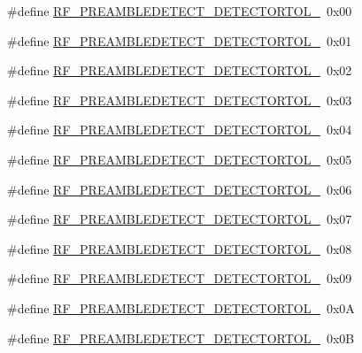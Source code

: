 \begin{DoxyCompactItemize}
\item 
\#define \hyperlink{sx1276Regs-Fsk_8h_a47aab5851ef02c5294a3f963992435e4}{R\+F\+\_\+\+P\+R\+E\+A\+M\+B\+L\+E\+D\+E\+T\+E\+C\+T\+\_\+\+D\+E\+T\+E\+C\+T\+O\+R\+T\+O\+L\+\_}~0x00
\item 
\#define \hyperlink{sx1276Regs-Fsk_8h_ad2ff8de8b56560355096d8a801ce5680}{R\+F\+\_\+\+P\+R\+E\+A\+M\+B\+L\+E\+D\+E\+T\+E\+C\+T\+\_\+\+D\+E\+T\+E\+C\+T\+O\+R\+T\+O\+L\+\_}~0x01
\item 
\#define \hyperlink{sx1276Regs-Fsk_8h_a5ba9d732666a53326a6d250c03a3bb5e}{R\+F\+\_\+\+P\+R\+E\+A\+M\+B\+L\+E\+D\+E\+T\+E\+C\+T\+\_\+\+D\+E\+T\+E\+C\+T\+O\+R\+T\+O\+L\+\_}~0x02
\item 
\#define \hyperlink{sx1276Regs-Fsk_8h_ab1241db9216a97e01cdae2448254397f}{R\+F\+\_\+\+P\+R\+E\+A\+M\+B\+L\+E\+D\+E\+T\+E\+C\+T\+\_\+\+D\+E\+T\+E\+C\+T\+O\+R\+T\+O\+L\+\_}~0x03
\item 
\#define \hyperlink{sx1276Regs-Fsk_8h_a95a2297e4d989009a9aa9381be6421b3}{R\+F\+\_\+\+P\+R\+E\+A\+M\+B\+L\+E\+D\+E\+T\+E\+C\+T\+\_\+\+D\+E\+T\+E\+C\+T\+O\+R\+T\+O\+L\+\_}~0x04
\item 
\#define \hyperlink{sx1276Regs-Fsk_8h_af616497c0128bb6a90bcc753f8b7cd98}{R\+F\+\_\+\+P\+R\+E\+A\+M\+B\+L\+E\+D\+E\+T\+E\+C\+T\+\_\+\+D\+E\+T\+E\+C\+T\+O\+R\+T\+O\+L\+\_}~0x05
\item 
\#define \hyperlink{sx1276Regs-Fsk_8h_a6fb0dbd911e9ed04d2f243052a818e19}{R\+F\+\_\+\+P\+R\+E\+A\+M\+B\+L\+E\+D\+E\+T\+E\+C\+T\+\_\+\+D\+E\+T\+E\+C\+T\+O\+R\+T\+O\+L\+\_}~0x06
\item 
\#define \hyperlink{sx1276Regs-Fsk_8h_a8fa771bedf632878d3a377491c0a31da}{R\+F\+\_\+\+P\+R\+E\+A\+M\+B\+L\+E\+D\+E\+T\+E\+C\+T\+\_\+\+D\+E\+T\+E\+C\+T\+O\+R\+T\+O\+L\+\_}~0x07
\item 
\#define \hyperlink{sx1276Regs-Fsk_8h_adb359b6eb996d119489f7d6afedc77a8}{R\+F\+\_\+\+P\+R\+E\+A\+M\+B\+L\+E\+D\+E\+T\+E\+C\+T\+\_\+\+D\+E\+T\+E\+C\+T\+O\+R\+T\+O\+L\+\_}~0x08
\item 
\#define \hyperlink{sx1276Regs-Fsk_8h_a8fe78c9fcf3aa09f5aa1831ba3c33b7a}{R\+F\+\_\+\+P\+R\+E\+A\+M\+B\+L\+E\+D\+E\+T\+E\+C\+T\+\_\+\+D\+E\+T\+E\+C\+T\+O\+R\+T\+O\+L\+\_}~0x09
\item 
\#define \hyperlink{sx1276Regs-Fsk_8h_ab7c305fbd95c7da0279d01830ca33de2}{R\+F\+\_\+\+P\+R\+E\+A\+M\+B\+L\+E\+D\+E\+T\+E\+C\+T\+\_\+\+D\+E\+T\+E\+C\+T\+O\+R\+T\+O\+L\+\_}~0x0A
\item 
\#define \hyperlink{sx1276Regs-Fsk_8h_ad65f1522c16c3d28b2ee4b8f0742962c}{R\+F\+\_\+\+P\+R\+E\+A\+M\+B\+L\+E\+D\+E\+T\+E\+C\+T\+\_\+\+D\+E\+T\+E\+C\+T\+O\+R\+T\+O\+L\+\_}~0x0B

\end{DoxyCompactItemize}
